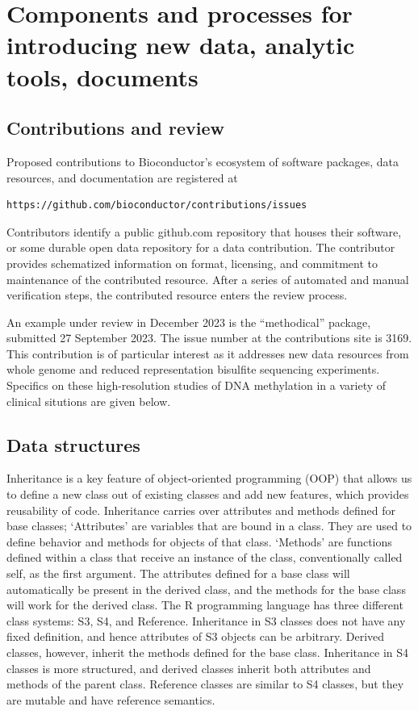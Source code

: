\section{Components and processes for introducing new data, analytic tools, documents}\label{class}

\subsection{Contributions and review}\label{contributions-and-review}

Proposed contributions to Bioconductor's ecosystem of software packages,
data resources, and documentation are registered at
\begin{verbatim}
https://github.com/bioconductor/contributions/issues 
\end{verbatim}
Contributors
identify a public github.com repository that houses
their software, or some durable open data repository
for a data contribution. The contributor
provides schematized information on format, licensing, and commitment
to maintenance of the contributed resource. After a series of
automated and manual verification steps, the contributed
resource enters the review process.

An example under review in December 2023 is the ``methodical''
package, submitted 27 September 2023. The issue number
at the contributions site is 3169. This contribution is of
particular interest as it addresses new data resources from
whole genome and reduced representation bisulfite sequencing
experiments. Specifics on these high-resolution studies
of DNA methylation
in a variety of clinical situtions are given below.

\subsection{Data structures}\label{data-structures}

Inheritance is a key feature of object-oriented programming (OOP) that allows us to define a new class out of existing classes and add new features, which provides reusability of code. Inheritance carries over attributes and methods defined for base classes; `Attributes' are variables that are bound in a class. They are used to define behavior and methods for objects of that class. `Methods' are functions defined within a class that receive an instance of the class, conventionally called self, as the first argument. The attributes defined for a base class will automatically be present in the derived class, and the methods for the base class will work for the derived class. The R programming language has three different class systems: S3, S4, and Reference. Inheritance in S3 classes does not have any fixed definition, and hence attributes of S3 objects can be arbitrary. Derived classes, however, inherit the methods defined for the base class. Inheritance in S4 classes is more structured, and derived classes inherit both attributes and methods of the parent class. Reference classes are similar to S4 classes, but they are mutable and have reference semantics.

